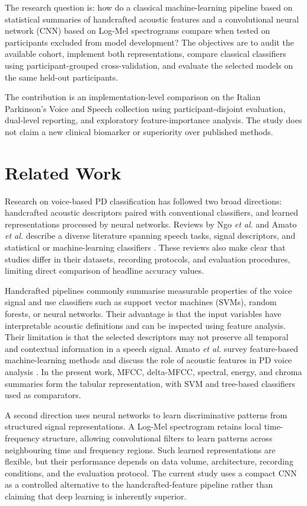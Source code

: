 \documentclass[11pt,a4paper]{article}
\begin{document}
The research question is: how do a classical machine-learning pipeline based on statistical summaries of handcrafted acoustic features and a convolutional neural network (CNN) based on Log-Mel spectrograms compare when tested on participants excluded from model development? The objectives are to audit the available cohort, implement both representations, compare classical classifiers using participant-grouped cross-validation, and evaluate the selected models on the same held-out participants.

The contribution is an implementation-level comparison on the Italian Parkinson's Voice and Speech collection using participant-disjoint evaluation, dual-level reporting, and exploratory feature-importance analysis. The study does not claim a new clinical biomarker or superiority over published methods.

\section{Related Work}
Research on voice-based PD classification has followed two broad directions: handcrafted acoustic descriptors paired with conventional classifiers, and learned representations processed by neural networks. Reviews by Ngo \emph{et al.} and Amato \emph{et al.} describe a diverse literature spanning speech tasks, signal descriptors, and statistical or machine-learning classifiers \cite{ngo2022,amato2023}. These reviews also make clear that studies differ in their datasets, recording protocols, and evaluation procedures, limiting direct comparison of headline accuracy values.

Handcrafted pipelines commonly summarise measurable properties of the voice signal and use classifiers such as support vector machines (SVMs), random forests, or neural networks. Their advantage is that the input variables have interpretable acoustic definitions and can be inspected using feature analysis. Their limitation is that the selected descriptors may not preserve all temporal and contextual information in a speech signal. Amato \emph{et al.} survey feature-based machine-learning methods and discuss the role of acoustic features in PD voice analysis \cite{amato2023}. In the present work, MFCC, delta-MFCC, spectral, energy, and chroma summaries form the tabular representation, with SVM and tree-based classifiers used as comparators.

A second direction uses neural networks to learn discriminative patterns from structured signal representations. A Log-Mel spectrogram retains local time-frequency structure, allowing convolutional filters to learn patterns across neighbouring time and frequency regions. Such learned representations are flexible, but their performance depends on data volume, architecture, recording conditions, and the evaluation protocol. The current study uses a compact CNN as a controlled alternative to the handcrafted-feature pipeline rather than claiming that deep learning is inherently superior.
\end{document}
